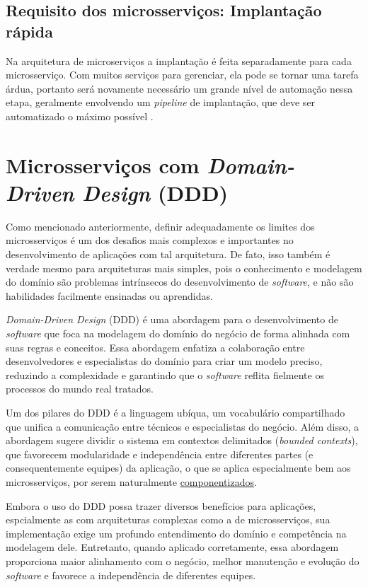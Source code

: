 \subsection{Requisito dos microsserviços: Implantação rápida}\label{boas-praticas-implantacao-rapida}

Na arquitetura de microserviços a implantação é feita separadamente para cada microsserviço. Com muitos serviços para gerenciar, ela pode se tornar uma tarefa árdua, portanto será novamente necessário um grande nível de automação nessa etapa, geralmente envolvendo um \emph{pipeline} de implantação, que deve ser automatizado o máximo possível \cite{martin-fowler-microservice-prereq}.

\section{Microsserviços com \emph{Domain-Driven Design} (DDD)}\label{section-ddd}

Como mencionado anteriormente, definir adequadamente os limites dos microsserviços é um dos desafios mais complexos e importantes no desenvolvimento de aplicações com tal arquitetura. De fato, isso também é verdade mesmo para arquiteturas mais simples, pois o conhecimento e modelagem do domínio são problemas intrínsecos do desenvolvimento de \emph{software}, e não são habilidades facilmente ensinadas ou aprendidas. 
\cite{livro-ddd}

\emph{Domain-Driven Design} (DDD) é uma abordagem para o desenvolvimento de \emph{software} que foca na modelagem do domínio do negócio de forma alinhada com suas regras e conceitos. Essa abordagem enfatiza a colaboração entre desenvolvedores e especialistas do domínio para criar um modelo preciso, reduzindo a complexidade e garantindo que o \emph{software} reflita fielmente os processos do mundo real tratados.
\cite{livro-ddd}

Um dos pilares do DDD é a linguagem ubíqua, um vocabulário compartilhado que unifica a comunicação entre técnicos e especialistas do negócio. Além disso, a abordagem sugere dividir o sistema em contextos delimitados (\emph{bounded contexts}), que favorecem modularidade e independência entre diferentes partes (e consequentemente equipes) da aplicação, o que se aplica especialmente bem aos microsserviços, por serem naturalmente \hyperref[secao-componentizacao]{componentizados}. 
\cite{livro-ddd}

Embora o uso do DDD possa trazer diversos benefícios para aplicações, espcialmente as com arquiteturas complexas como a de microsserviços, sua implementação exige um profundo entendimento do domínio e competência na modelagem dele. Entretanto, quando aplicado corretamente, essa abordagem proporciona maior alinhamento com o negócio, melhor manutenção e evolução do \emph{software} e favorece a independência de diferentes equipes.
\cite{livro-ddd}



